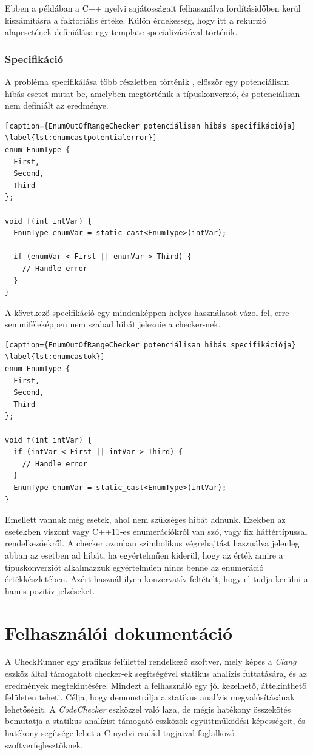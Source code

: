 \documentclass[a4paper,12pt]{report}
\begin{document}
Ebben a példában a C++ nyelvi sajátosságait felhasználva fordításidőben kerül kiszámításra a faktoriális értéke. Külön érdekesség, hogy itt a rekurzió alapesetének definiálása egy template-specializációval történik.


\subsection{Specifikáció}
A probléma specifikálása több részletben történik \cite{securecodingint50}, először egy potenciálisan hibás esetet mutat be, amelyben megtörténik a típuskonverzió, és potenciálisan nem definiált az eredménye.

\begin{lstlisting}[caption={EnumOutOfRangeChecker potenciálisan hibás specifikációja}
\label{lst:enumcastpotentialerror}]
enum EnumType {
  First,
  Second,
  Third
};
 
void f(int intVar) {
  EnumType enumVar = static_cast<EnumType>(intVar);
 
  if (enumVar < First || enumVar > Third) {
    // Handle error
  }
}
\end{lstlisting}

A következő specifikáció egy mindenképpen helyes használatot vázol fel, erre semmiféleképpen nem szabad hibát jeleznie a checker-nek.

\begin{lstlisting}[caption={EnumOutOfRangeChecker potenciálisan hibás specifikációja}
\label{lst:enumcastok}]
enum EnumType {
  First,
  Second,
  Third
};
 
void f(int intVar) {
  if (intVar < First || intVar > Third) {
    // Handle error
  }
  EnumType enumVar = static_cast<EnumType>(intVar);
}
\end{lstlisting}

Emellett vannak még esetek, ahol nem szükséges hibát adnunk. Ezekben az esetekben viszont vagy C++11-es enumerációkról van szó, vagy fix háttértípussal rendelkezőekről. A checker azonban szimbolikus végrehajtást használva jelenleg abban az esetben ad hibát, ha egyértelműen kiderül, hogy az érték amire a típuskonverziót alkalmazzuk egyértelműen nincs benne az enumeráció értékkészletében. Azért használ ilyen konzervatív feltételt, hogy el tudja kerülni a hamis pozitív jelzéseket.

\chapter{Felhasználói dokumentáció}
A CheckRunner egy grafikus felülettel rendelkező szoftver, mely képes a \emph{Clang} eszköz által támogatott checker-ek segítségével statikus analízis futtatására, és az eredmények megtekintésére. Mindezt a felhasználó egy jól kezelhető, áttekinthető felületen teheti. Célja, hogy demonstrálja a statikus analízis megvalósításának lehetőségit. A \emph{CodeChecker} eszközzel való laza, de mégis hatékony összekötés bemutatja a statikus analízist támogató eszközök együttműködési képességeit, és hatékony segítsége lehet a C nyelvi család tagjaival foglalkozó szoftverfejlesztőknek.
\end{document}
